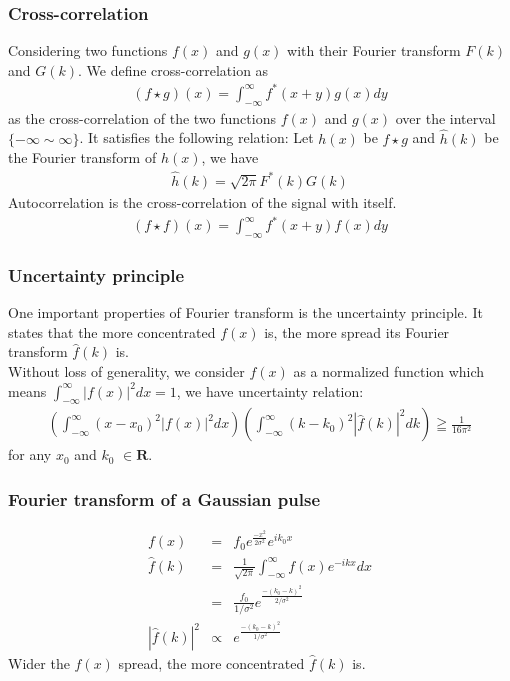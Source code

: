 \documentclass{beamer}
\begin{document}
\begin{frame}
\frametitle{Cross-correlation}
Considering two functions $f(x)$ and $g(x)$ with their Fourier transform $F(k)$ and $G(k)$. We define cross-correlation as
\begin{eqnarray}
(f\star g)(x) = \int_{-\infty}^{\infty}f^*(x+y)g(x)dy
\label{eq:cross_correlation}
\end{eqnarray}
as the cross-correlation of the two functions $f(x)$ and $g(x)$ over the interval $\{ -\infty \sim \infty \}$. It satisfies the following relation:
Let $h(x)$ be $f \star g$ and $\hat{h}(k)$ be the Fourier transform of $h(x)$, we have
\begin{eqnarray}
\hat{h}(k) = \sqrt{2\pi}F^*(k)G(k)
\label{eq:cross_correlation_FT}
\end{eqnarray}
Autocorrelation is the cross-correlation of the signal with itself.
\begin{eqnarray}
(f\star f)(x) = \int_{-\infty}^{\infty}f^*(x+y)f(x)dy
\label{eq:autocorrelation}
\end{eqnarray}
\end{frame}
\begin{frame}
\frametitle{Uncertainty principle}
One important properties of Fourier transform is the uncertainty principle. It states that the more concentrated $f(x)$ is, the more spread its Fourier transform $\hat{f}(k)$ is.\\
Without loss of generality, we consider $f(x)$ as a normalized function which means $\int_{-\infty}^{\infty}|f(x)|^2 dx = 1$, we have uncertainty relation:
\begin{eqnarray}
\left( \int_{-\infty}^{\infty}(x-x_0)^2|f(x)|^2 dx\right) \left( \int_{-\infty}^{\infty}(k-k_0)^2|\hat{f}(k)|^2 dk\right) \geqq \frac{1}{16\pi^2}
\label{eq:uncertainty_wiki}
\end{eqnarray}
for any $x_0$ and $k_0$ $\in \mathbf{R}$.~\cite{wiki_FT}
\end{frame}
\begin{frame}
\frametitle{Fourier transform of a Gaussian pulse}
\begin{eqnarray}
f(x)&=&f_0e^{\frac{-x^2}{2\sigma^2}}e^{ik_0x} \nonumber \\
\hat{f}(k)&=&\frac{1}{\sqrt{2\pi}}\int_{-\infty}^{\infty}f(x)e^{-ikx}dx \nonumber \\
&=&\frac{f_0}{1/\sigma^2} e^{\frac{-(k_0-k)^2}{2/\sigma^2}}\nonumber \\
|\hat{f}(k)|^2&\varpropto&e^{\frac{-(k_0-k)^2}{1/\sigma^2}}\nonumber 
\end{eqnarray}
Wider the $f(x)$ spread, the more concentrated $\hat{f}(k)$ is.
\end{frame}
\end{document}
